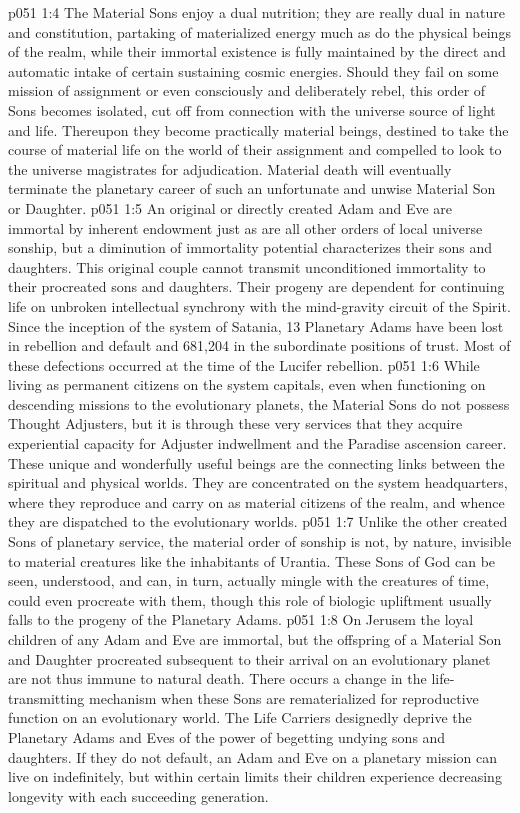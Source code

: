 \vs p051 1:4 The Material Sons enjoy a dual nutrition; they are really dual in nature and constitution, partaking of materialized energy much as do the physical beings of the realm, while their immortal existence is fully maintained by the direct and automatic intake of certain sustaining cosmic energies. Should they fail on some mission of assignment or even consciously and deliberately rebel, this order of Sons becomes isolated, cut off from connection with the universe source of light and life. Thereupon they become practically material beings, destined to take the course of material life on the world of their assignment and compelled to look to the universe magistrates for adjudication. Material death will eventually terminate the planetary career of such an unfortunate and unwise Material Son or Daughter.
\vs p051 1:5 An original or directly created Adam and Eve are immortal by inherent endowment just as are all other orders of local universe sonship, but a diminution of immortality potential characterizes their sons and daughters. This original couple cannot transmit unconditioned immortality to their procreated sons and daughters. Their progeny are dependent for continuing life on unbroken intellectual synchrony with the mind\hyp{}gravity circuit of the Spirit. Since the inception of the system of Satania, 13 Planetary Adams have been lost in rebellion and default and 681,204 in the subordinate positions of trust. Most of these defections occurred at the time of the Lucifer rebellion.
\vs p051 1:6 \pc While living as permanent citizens on the system capitals, even when functioning on descending missions to the evolutionary planets, the Material Sons do not possess Thought Adjusters, but it is through these very services that they acquire experiential capacity for Adjuster indwellment and the Paradise ascension career. These unique and wonderfully useful beings are the connecting links between the spiritual and physical worlds. They are concentrated on the system headquarters, where they reproduce and carry on as material citizens of the realm, and whence they are dispatched to the evolutionary worlds.
\vs p051 1:7 Unlike the other created Sons of planetary service, the material order of sonship is not, by nature, invisible to material creatures like the inhabitants of Urantia. These Sons of God can be seen, understood, and can, in turn, actually mingle with the creatures of time, could even procreate with them, though this role of biologic upliftment usually falls to the progeny of the Planetary Adams.
\vs p051 1:8 \pc On Jerusem the loyal children of any Adam and Eve are immortal, but the offspring of a Material Son and Daughter procreated subsequent to their arrival on an evolutionary planet are not thus immune to natural death. There occurs a change in the life\hyp{}transmitting mechanism when these Sons are rematerialized for reproductive function on an evolutionary world. The Life Carriers designedly deprive the Planetary Adams and Eves of the power of begetting undying sons and daughters. If they do not default, an Adam and Eve on a planetary mission can live on indefinitely, but within certain limits their children experience decreasing longevity with each succeeding generation.
